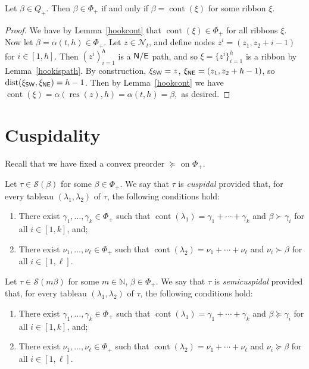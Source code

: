 \documentclass[Unicode,ALCO]{cedram}
\newcommand{\res}{\operatorname{res}}
\newcommand{\N}{\mathcal{N}}
\newcommand{\SSSS}{\mathcal{S}}
\newcommand{\0}{{\bar 0}}
\newcommand{\dist}{{\mathrm {dist}}}
\newcommand{\NN}{{\mathbb N}}
\newcommand{\no}{{\sf N}}
\newcommand{\ea}{{\sf E}}
\newcommand{\nnee}{{\sf NE}}
\newcommand{\ssww}{{\sf SW}}
\def\cont{{\operatorname{cont}}}
\begin{document}
\begin{coro}\label{skewpos}
Let \(\beta \in Q_+\). Then \(\beta \in \Phi_+\) if and only if \(\beta = \cont(\xi)\) for some ribbon \(\xi\).
\end{coro}
\begin{proof}
We have by Lemma~\ref{hookcont} that \(\cont(\xi) \in \Phi_+\) for all ribbons \(\xi\). Now let \(\beta = \alpha(t,h) \in \Phi_+\). Let \(z \in \N_t\), and define nodes \(z^i = (z_1, z_2 + i-1)\) for \(i \in [1,h]\). Then \((z^i)_{i=1}^h\) is a \(\no/\ea\) path, and so \(\xi = \{z^i\}_{i=1}^h\) is a ribbon by Lemma~\ref{hookispath}. By construction, \(\xi_{\ssww} = z\), \(\xi_{\nnee} = (z_1, z_2+h-1)\), so \(\dist(\xi_{\ssww}, \xi_{\nnee}) = h-1\). Then by Lemma~\ref{hookcont} we have
\(
\cont(\xi) = \alpha(\res(z), h) = \alpha(t,h) = \beta,
\)
as desired.
\end{proof}

\section{Cuspidality}
Recall that we have fixed a convex preorder \(\succeq\) on \(\Phi_+\).
\begin{defi}\label{cuspdef}
Let \(\tau \in \SSSS(\beta)\) for some \(\beta \in \Phi_+\). We say that \(\tau\) is {\em cuspidal} provided that, for every tableau \((\lambda_1, \lambda_2)\) of \(\tau\), the following conditions hold:
\begin{enumerate}
\item There exist \(\gamma_1, \ldots, \gamma_k \in \Phi_+\) such that \(\cont(\lambda_1) = \gamma_1 + \cdots + \gamma_k\) and \(\beta \succ \gamma_i\) for all \(i \in [1,k]\), and; \label{cond:cuspdef1}
\item There exist \(\nu_1, \ldots, \nu_\ell \in \Phi_+\) such that \(\cont(\lambda_2) = \nu_1 + \cdots + \nu_\ell\) and \(\nu_i \succ \beta\) for all \(i \in [1,\ell]\). \label{cond:cuspdef2}
\end{enumerate}
\end{defi}

\begin{defi}\label{semicuspdef}
Let \( \tau \in \SSSS(m \beta)\) for some \(m \in \NN\), \(\beta \in \Phi_+\). We say that \(\tau\) is {\em semicuspidal} provided that, for every tableau \((\lambda_1, \lambda_2)\) of \(\tau\), the following conditions hold:
\begin{enumerate}
\item There exist \(\gamma_1, \ldots, \gamma_k \in \Phi_+\) such that \(\cont(\lambda_1) = \gamma_1 + \cdots + \gamma_k\) and \(\beta \succeq \gamma_i\) for all \(i \in [1,k]\), and;
\item There exist \(\nu_1, \ldots, \nu_\ell \in \Phi_+\) such that \(\cont(\lambda_2) = \nu_1 + \cdots + \nu_\ell\) and \(\nu_i \succeq \beta\) for all \(i \in [1,\ell]\).
\end{enumerate}
\end{defi}
\end{document}
